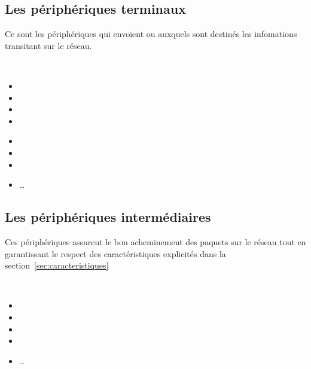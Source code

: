 \documentclass[10pt,fleqn]{article} %
\begin{document}
\subsection{Les périphériques terminaux}
\begin{defi}
  Ce sont les périphériques qui envoient ou auxquels sont destinés les infomations transitant sur le réseau.
\end{defi}
\begin{exemple}~\\
  \begin{minipage}[c]{.5\textwidth}
    \begin{itemize}
      \item {}
      \item {}
      \item {}
      \item {}
    \end{itemize}
  \end{minipage}
  \begin{minipage}[c]{.5\textwidth}
    \begin{itemize}
      \item {}
      \item {}
      \item {}
      \item \dots
    \end{itemize}
  \end{minipage}
\end{exemple}
\subsection{Les périphériques intermédiaires}
\begin{defi}
  Ces périphériques assurent le bon acheminement des paquets sur le réseau tout en garantissant le respect des caractéristiques explicités dans la section~\ref{sec:caracteristiques}
\end{defi}
\begin{exemple}~\\
    \begin{itemize}
      \item {}
      \item {}
      \item {}
      \item {}
      \item \dots
    \end{itemize}
\end{exemple}
\end{document}
